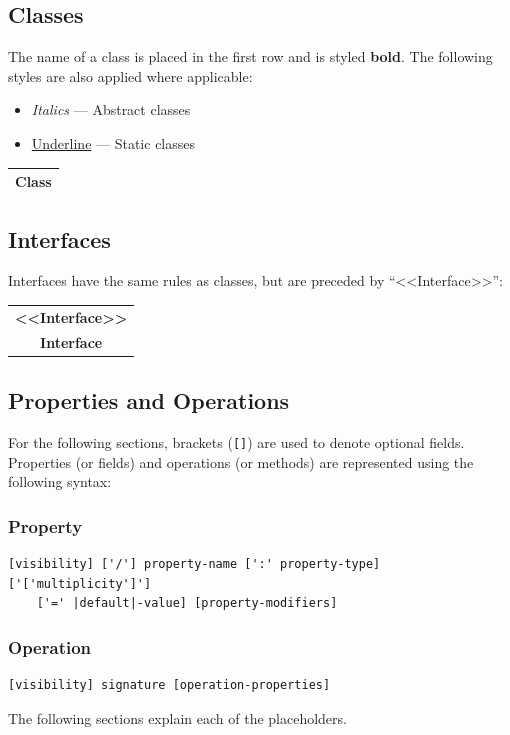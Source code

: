 \documentclass{article}
\begin{document}
\subsection{Classes}
The name of a class is placed in the first row and is styled
\textbf{bold}. The following styles are also applied where applicable:
\begin{itemize}
    \item \textit{Italics} --- Abstract classes
    \item \underline{Underline} --- Static classes
\end{itemize}
\begin{table}[H]
    \centering
    \begin{tabular}{|c|}
        \hline
        \textbf{Class} \\
        \hline
    \end{tabular}
\end{table}
\subsection{Interfaces}
Interfaces have the same rules as classes, but are preceded by
``<<Interface>>'':
\begin{table}[H]
    \centering
    \begin{tabular}{|c|}
        \hline
        \textbf{<<Interface>>} \\
        \textbf{Interface}     \\
        \hline
    \end{tabular}
\end{table}
\subsection{Properties and Operations}
For the following sections, brackets (\texttt{[]}) are used
to denote optional fields. Properties (or fields) and operations (or
methods) are represented using the following syntax:
\subsubsection{Property}
\begin{verbatim}
[visibility] ['/'] property-name [':' property-type] ['['multiplicity']']
    ['=' |default|-value] [property-modifiers]
\end{verbatim}
\subsubsection{Operation}
\begin{verbatim}
[visibility] signature [operation-properties]
\end{verbatim}
The following sections explain each of the placeholders.
\end{document}
